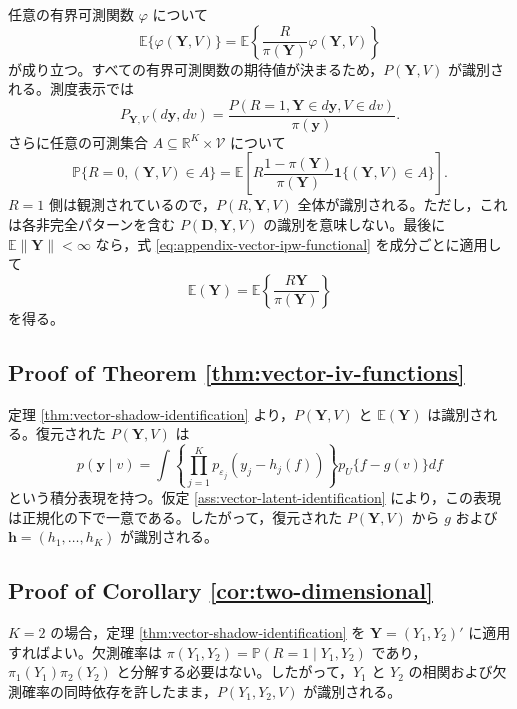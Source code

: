 \documentclass[10pt,a4paper]{article}
\newcommand{\E}{\mathbb{E}}
\newcommand{\Prb}{\mathbb{P}}
\newcommand{\R}{\mathbb{R}}
\newcommand{\1}{\mathbf{1}}
\newcommand{\Y}{\bm{Y}}
\newcommand{\D}{\bm{D}}
\begin{document}
任意の有界可測関数 $\varphi$ について
\begin{equation}
  \E\{\varphi(\Y,V)\}
  =\E\left\{\frac{R}{\pi(\Y)}\varphi(\Y,V)\right\}
  \label{eq:appendix-vector-ipw-functional}
\end{equation}
が成り立つ。すべての有界可測関数の期待値が決まるため，$P(\Y,V)$ が識別される。測度表示では
\begin{equation}
  P_{\Y,V}(d\bm y,dv)
  =\frac{P(R=1,\Y\in d\bm y,V\in dv)}{\pi(\bm y)}.
  \label{eq:appendix-vector-measure-recovery}
\end{equation}
さらに任意の可測集合 $A\subseteq\R^K\times\mathcal V$ について
\begin{equation}
  \Prb\{R=0,(\Y,V)\in A\}
  =\E\left[
    R\frac{1-\pi(\Y)}{\pi(\Y)}
    \1\{(\Y,V)\in A\}
  \right].
  \label{eq:appendix-vector-noncomplete-recovery}
\end{equation}
$R=1$ 側は観測されているので，$P(R,\Y,V)$ 全体が識別される。ただし，これは各非完全パターンを含む $P(\D,\Y,V)$ の識別を意味しない。最後に $\E\|\Y\|<\infty$ なら，式 \eqref{eq:appendix-vector-ipw-functional} を成分ごとに適用して
\begin{equation}
  \E(\Y)=\E\left\{\frac{R\Y}{\pi(\Y)}\right\}
\end{equation}
を得る。

\subsection{Proof of Theorem \ref{thm:vector-iv-functions}}
定理 \ref{thm:vector-shadow-identification} より，$P(\Y,V)$ と $\E(\Y)$ は識別される。復元された $P(\Y,V)$ は
\begin{equation}
  p(\bm y\mid v)
  =\int
    \left\{\prod_{j=1}^K p_{\varepsilon_j}(y_j-h_j(f))\right\}
    p_U\{f-g(v)\}
    df
  \label{eq:appendix-vector-iv-kernel}
\end{equation}
という積分表現を持つ。仮定 \ref{ass:vector-latent-identification} により，この表現は正規化の下で一意である。したがって，復元された $P(\Y,V)$ から $g$ および $\bm h=(h_1,\ldots,h_K)$ が識別される。

\subsection{Proof of Corollary \ref{cor:two-dimensional}}
$K=2$ の場合，定理 \ref{thm:vector-shadow-identification} を $\Y=(Y_1,Y_2)'$ に適用すればよい。欠測確率は $\pi(Y_1,Y_2)=\Prb(R=1\mid Y_1,Y_2)$ であり，$\pi_1(Y_1)\pi_2(Y_2)$ と分解する必要はない。したがって，$Y_1$ と $Y_2$ の相関および欠測確率の同時依存を許したまま，$P(Y_1,Y_2,V)$ が識別される。
\end{document}
